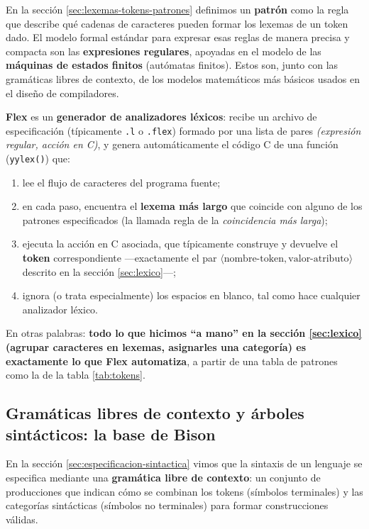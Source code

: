 \documentclass[11pt,a4paper]{article}
\begin{document}
En la sección \ref{sec:lexemas-tokens-patrones} definimos un \textbf{patrón} como la regla que
describe qué cadenas de caracteres pueden formar los lexemas de un token dado. El modelo formal
estándar para expresar esas reglas de manera precisa y compacta son las \textbf{expresiones
regulares}, apoyadas en el modelo de las \textbf{máquinas de estados finitos} (autómatas
finitos). Estos son, junto con las gramáticas libres de contexto, de los modelos matemáticos
más básicos usados en el diseño de compiladores.

\textbf{Flex} es un \textbf{generador de analizadores léxicos}: recibe un archivo de
especificación (típicamente \texttt{.l} o \texttt{.flex}) formado por una lista de pares
\textit{(expresión regular, acción en C)}, y genera automáticamente el código C de una función
(\texttt{yylex()}) que:

\begin{enumerate}
    \item lee el flujo de caracteres del programa fuente;
    \item en cada paso, encuentra el \textbf{lexema más largo} que coincide con alguno de los
    patrones especificados (la llamada regla de la \textit{coincidencia más larga});
    \item ejecuta la acción en C asociada, que típicamente construye y devuelve el
    \textbf{token} correspondiente —exactamente el par $\langle \text{nombre-token},
    \text{valor-atributo} \rangle$ descrito en la sección \ref{sec:lexico}—;
    \item ignora (o trata especialmente) los espacios en blanco, tal como hace cualquier
    analizador léxico.
\end{enumerate}

En otras palabras: \textbf{todo lo que hicimos ``a mano'' en la sección \ref{sec:lexico}
(agrupar caracteres en lexemas, asignarles una categoría) es exactamente lo que Flex
automatiza}, a partir de una tabla de patrones como la de la tabla \ref{tab:tokens}.

\subsection{Gramáticas libres de contexto y árboles sintácticos: la base de Bison}

En la sección \ref{sec:especificacion-sintactica} vimos que la sintaxis de un lenguaje se
especifica mediante una \textbf{gramática libre de contexto}: un conjunto de producciones que
indican cómo se combinan los tokens (símbolos terminales) y las categorías sintácticas
(símbolos no terminales) para formar construcciones válidas.
\end{document}
